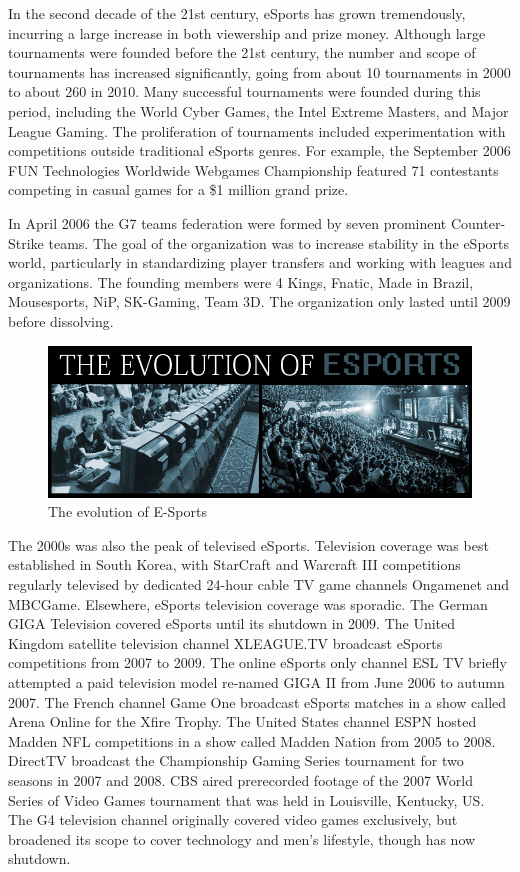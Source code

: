 		In the second decade of the 21st century, eSports has grown tremendously, incurring a large increase in both viewership and prize money. Although large tournaments were founded before the 21st century, the number and scope of tournaments has increased significantly, going from about 10 tournaments in 2000 to about 260 in 2010. Many successful tournaments were founded during this period, including the World Cyber Games, the Intel Extreme Masters, and Major League Gaming. The proliferation of tournaments included experimentation with competitions outside traditional eSports genres. For example, the September 2006 FUN Technologies Worldwide Webgames Championship featured 71 contestants competing in casual games for a \$1 million grand prize.
		
		In April 2006 the G7 teams federation were formed by seven prominent Counter-Strike teams. The goal of the organization was to increase stability in the eSports world, particularly in standardizing player transfers and working with leagues and organizations. The founding members were 4 Kings, Fnatic, Made in Brazil, Mousesports, NiP, SK-Gaming, Team 3D. The organization only lasted until 2009 before dissolving.
		
								\begin{figure}[!h]
									\begin{center}
										\includegraphics[width=0.68\linewidth]{images/evolution}
										\caption{The evolution of E-Sports}
									\end{center}
								\end{figure}
		
		The 2000s was also the peak of televised eSports. Television coverage was best established in South Korea, with StarCraft and Warcraft III competitions regularly televised by dedicated 24-hour cable TV game channels Ongamenet and MBCGame. Elsewhere, eSports television coverage was sporadic. The German GIGA Television covered eSports until its shutdown in 2009. The United Kingdom satellite television channel XLEAGUE.TV broadcast eSports competitions from 2007 to 2009. The online eSports only channel ESL TV briefly attempted a paid television model re-named GIGA II from June 2006 to autumn 2007. The French channel Game One broadcast eSports matches in a show called Arena Online for the Xfire Trophy. The United States channel ESPN hosted Madden NFL competitions in a show called Madden Nation from 2005 to 2008. DirectTV broadcast the Championship Gaming Series tournament for two seasons in 2007 and 2008. CBS aired prerecorded footage of the 2007 World Series of Video Games tournament that was held in Louisville, Kentucky, US. The G4 television channel originally covered video games exclusively, but broadened its scope to cover technology and men's lifestyle, though has now shutdown.
		

